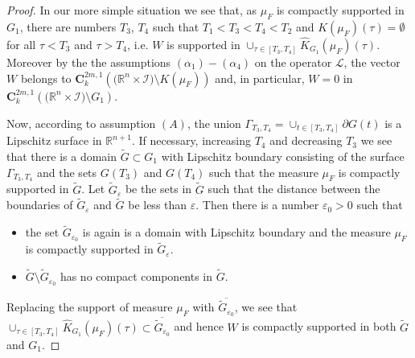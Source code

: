 \documentclass{amsart}
\theoremstyle{definition}
\theoremstyle{remark}
\numberwithin{equation}{section}
\begin{document}
\begin{proof}
In our more simple situation  we see that, as $\mu_F$ is compactly supported in $ G_1$, there 
are numbers $T_3$, $T_4$ such that $T_1<T_3<T_4<T_2$ and $K(\mu_F) (\tau) =\emptyset $ for 
all $\tau <T_3$ and $\tau>T_4$, i.e. $W$ is supported in $\cup_{\tau \in [T_3,T_4] } \hat 
K_{G_1}(\mu_F) (\tau)$. Moreover by the the assumptions $(\alpha_1)-(\alpha_4)$ on the 
operator ${\mathcal L}$, the vector $W$ belongs to ${\mathbf C}^{2m,1}_k 
(\Big({\mathbb R}^{n}\times \mathcal{I}\Big)\setminus K(\mu_F))$ and, 
in particular, $W=0$ in ${\mathbf C}^{2m,1}_k (\Big({\mathbb R}^{n}\times \mathcal{I}\Big)
\setminus G_1)$.

Now, according to assumption $(A)$, the union $\Gamma _{T_3,T_4}=\cup_{t\in [T_3,T_4]} 
\partial G (t)$ is a Lipschitz surface in ${\mathbb R}^{n+1}$. If necessary, 
increasing $T_4$ and decreasing $T_3$ we see that there is a domain 
$\tilde G \subset G_1$ with Lipschitz boundary consisting of the surface 
$\Gamma _{T_3,T_4}$ and the sets $G(T_3)$ and $G(T_4)$ such that the measure 
$\mu_F$ is compactly supported in $\tilde G$. 
Let $\tilde G_\varepsilon$ be the sets in $\tilde G$ such that the distance between 
the boundaries of $\tilde G_\varepsilon$ and $\tilde G$ be less than $\varepsilon$. 
Then there is a number $\varepsilon_0>0$ such that 
\begin{itemize}
\item
the set $\tilde G_{\varepsilon_0}$ is again is a domain with Lipschitz boundary and  the 
measure $\mu_F$ is compactly supported in $\tilde G_{\varepsilon}$. 
\item 
$\tilde G \setminus \tilde G_{\varepsilon_0}$ has no compact components in $\tilde G$.
\end{itemize} 
Replacing the support of measure $\mu_F$ with $\overline {\tilde G_{\varepsilon_0}}$, we see 
that $\cup_{\tau \in [T_3,T_4] } \hat K_{G_1}(\mu_F) (\tau) \subset \overline 
{\tilde G_{\varepsilon_0}}$ and hence $W$ is compactly supported in both $\tilde G$ and $G_1$.


\end{proof}
\end{document}
